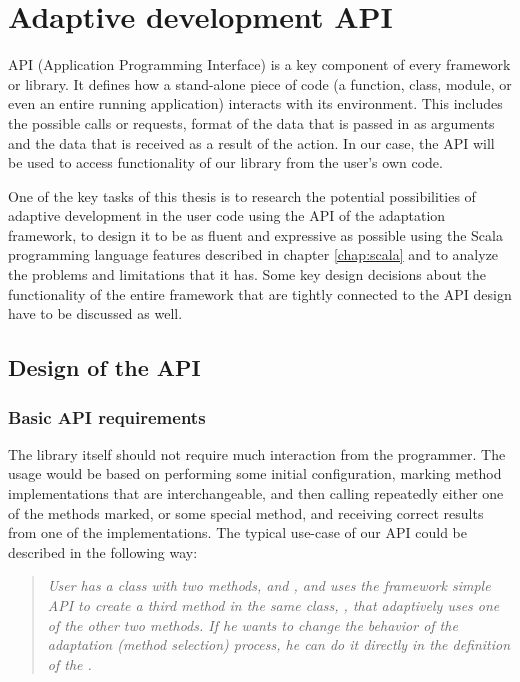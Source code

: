 \chapter{Adaptive development API}
\label{chapter:api}

API (Application Programming Interface) is a key component of every framework or library. It defines how a stand-alone piece of code (a function, class, module, or even an entire running application) interacts with its environment. This includes the possible calls or requests, format of the data that is passed in as arguments and the data that is received as a result of the action. In our case, the API will be used to access functionality of our library from the user's own code.

One of the key tasks of this thesis is to research the potential possibilities of adaptive development in the user code using the API of the adaptation framework, to design it to be as fluent and expressive as possible using the Scala programming language features described in chapter \ref{chap:scala} and to analyze the problems and limitations that it has. 
Some key design decisions about the functionality of the entire framework that are tightly connected to the API design have to be discussed as well.

\section{Design of the API}

\subsection{Basic API requirements}

The library itself should not require much interaction from the programmer. The usage would be based on performing some initial configuration, marking method implementations that are interchangeable, and then calling repeatedly either one of the methods marked, or some special method, and receiving correct results from one of the implementations. The typical use-case of our API could be described in the following way:

\blockquote{
\textit{User has a class with two methods,  and , and uses the framework simple API to create a third method in the same class, , that adaptively uses one of the other two methods. If he wants to change the behavior of the adaptation (method selection) process, he can do it directly in the definition of the .}
}

